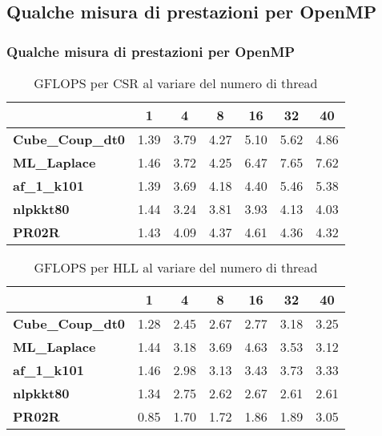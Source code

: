 \documentclass{beamer}
\begin{document}
\subsection{Qualche misura di prestazioni per OpenMP}
\begin{frame}
    \frametitle{Qualche misura di prestazioni per OpenMP}
    
    \begin{table}
    \centering
    \begin{tabular}{| l | c | c | c | c | c | c |}
    \hline
    & \textbf{1} & \textbf{4} & \textbf{8} & \textbf{16} & \textbf{32} & \textbf{40} \\
    \hline
    \hline
    \textbf{Cube\_Coup\_dt0} & 1.39 & 3.79 & 4.27 & 5.10 & 5.62 & 4.86 \\
    \textbf{ML\_Laplace} & 1.46 & 3.72 & 4.25 & 6.47 & 7.65 & 7.62 \\
    \textbf{af\_1\_k101} & 1.39 & 3.69 & 4.18 & 4.40 & 5.46 & 5.38 \\
    \textbf{nlpkkt80} & 1.44 & 3.24 & 3.81 & 3.93 & 4.13 & 4.03 \\
    \textbf{PR02R} & 1.43 & 4.09 & 4.37 & 4.61 & 4.36 & 4.32 \\
    \hline
    \end{tabular}
    \caption{GFLOPS per CSR al variare del numero di thread}
    \end{table}
    
    \begin{table}
    \centering
    \begin{tabular}{| l | c | c | c | c | c | c |}
    \hline
    & \textbf{1} & \textbf{4} & \textbf{8} & \textbf{16} & \textbf{32} & \textbf{40} \\
    \hline
    \hline
    \textbf{Cube\_Coup\_dt0} & 1.28 & 2.45 & 2.67 & 2.77 & 3.18 & 3.25 \\
    \textbf{ML\_Laplace} & 1.44 & 3.18 & 3.69 & 4.63 & 3.53 & 3.12 \\
    \textbf{af\_1\_k101} & 1.46 & 2.98 & 3.13 & 3.43 & 3.73 & 3.33 \\
    \textbf{nlpkkt80} & 1.34 & 2.75 & 2.62 & 2.67 & 2.61 & 2.61 \\
    \textbf{PR02R} & 0.85 & 1.70 & 1.72 & 1.86 & 1.89 & 3.05 \\
    \hline
    \end{tabular}
    \caption{GFLOPS per HLL al variare del numero di thread}
    \end{table}
    
\end{frame}
\end{document}
